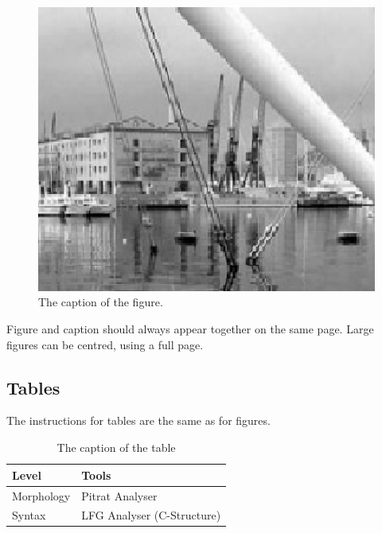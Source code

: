 \documentclass[10pt, a4paper]{article}
\begin{document}
\begin{figure}[!h]
\begin{center}
\includegraphics[scale=0.5]{image1.eps} 
\caption{The caption of the figure.}
\label{fig.1}
\end{center}
\end{figure}

Figure and caption should always appear together on the same page. Large figures
can be centred, using a full page.

\subsection{Tables}

The instructions for tables are the same as for figures.
%
\begin{table}[!h]
\begin{center}
\begin{tabular}{|l|l|}

      \hline
      Level&Tools\\
      \hline\hline
      Morphology & Pitrat Analyser\\
      Syntax & LFG Analyser (C-Structure)\\
      \hline

\end{tabular}
\caption{The caption of the table}
 \end{center}
\end{table}
\end{document}
